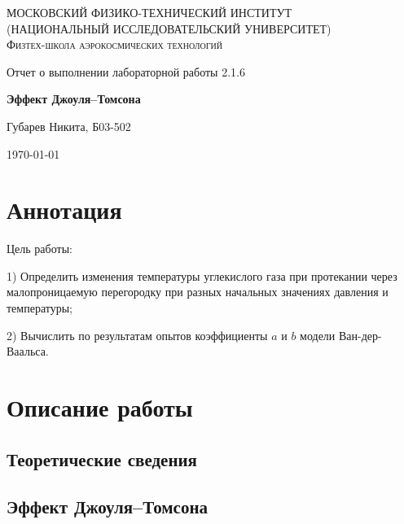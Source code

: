\documentclass[a4paper]{article}
\begin{document}
	
	\begin{titlepage}
		\centering
		{\scshape\Large МОСКОВСКИЙ ФИЗИКО-ТЕХНИЧЕСКИЙ ИНСТИТУТ \\
			(НАЦИОНАЛЬНЫЙ ИССЛЕДОВАТЕЛЬСКИЙ УНИВЕРСИТЕТ)\\ %
			Физтех-школа аэрокосмических технологий}
		
		\vspace{4cm} %
		{\LARGE Отчет о выполнении лабораторной работы 2.1.6}
		\vspace{1cm} %
		
		{\huge\bf Эффект Джоуля–Томсона}
		
		\vspace{1cm} %
		\vfill %
		
		\begin{flushright} %
			{\LARGE Губарев Никита, Б03-502}
		\end{flushright}
		\vfill 
		\today %
	\end{titlepage}
	\tableofcontents 
	\section{Аннотация}
	Цель работы: 
	
	1) Определить изменения температуры углекислого газа при протекании через малопроницаемую перегородку при разных начальных значениях давления и температуры;
	
	2) Вычислить по результатам опытов коэффициенты $a$ и $b$ модели Ван-дер-Ваальса.
	
	\section{Описание работы}
	\subsection{Теоретические сведения}
	
	\subsection*{Эффект Джоуля--Томсона}
	
\end{document}
